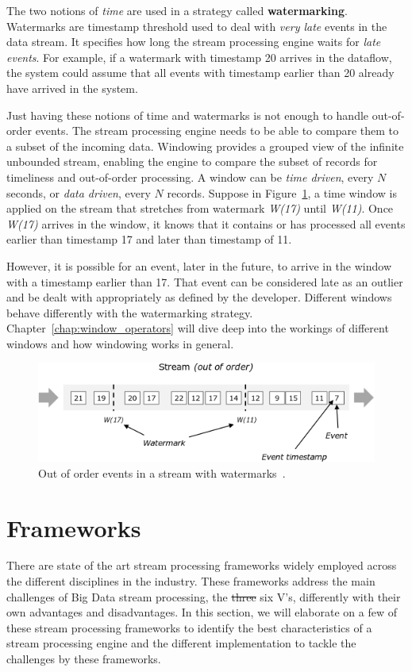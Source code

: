 The two notions of \emph{time} are used in a strategy called \textbf{watermarking}. 
Watermarks are timestamp threshold used to deal with \emph{very late} events 
in the data stream. It specifies how long the stream processing engine 
waits for \emph{late events}. For example, if a watermark with timestamp 
20 arrives in the dataflow, the system could assume that all events 
with timestamp earlier than 20 already have arrived in the system. 

Just having these notions of time and watermarks is not enough to 
handle out-of-order events. The stream processing engine needs to be able to compare them to a subset of the 
incoming data. Windowing provides a grouped view of the infinite unbounded stream, 
enabling the engine to compare the subset of records for timeliness and out-of-order 
processing. A window can be \emph{time driven}, every $N$ seconds, or \emph{data driven}, 
every $N$ records. 
Suppose in Figure~\ref{fig:watermark}, a time window is applied on the stream that
stretches from watermark \emph{W(17)} until \emph{W(11)}. 
Once \emph{W(17)} arrives in the window, it knows that it contains or has 
processed all events earlier than timestamp 17 and later than timestamp of 11.  

However, it is possible for an event, later in the future, to arrive in the window 
with a timestamp earlier than 17. That event can be considered late as an outlier and 
be dealt with appropriately as defined by the developer. Different windows 
behave differently with the watermarking strategy. Chapter~\ref{chap:window_operators}
will dive deep into the workings of different windows and how windowing works in 
general. 


\begin{figure}[htpb]
    \centering
    \includegraphics[width=0.8\linewidth]{fig/stream_watermark_out_of_order.png}
    \caption{Out of order events in a stream with watermarks~\cite{watermark_flink}.}
    \label{fig:watermark}
\end{figure}


\section{Frameworks}
\label{sec:frameworks}
There are state of the art stream processing frameworks widely employed across the 
different disciplines in the industry. These frameworks address the main challenges of 
Big Data stream processing, the \sout{three} six V's, differently with their own advantages and 
disadvantages.
In this section, we will elaborate 
on a few of these stream processing frameworks to identify the best characteristics of a 
stream processing engine and the different implementation to tackle the challenges by these 
frameworks.



